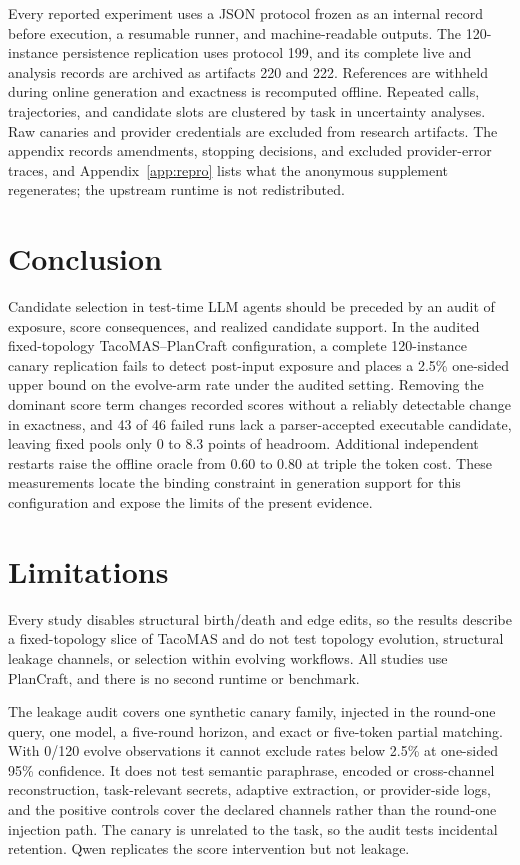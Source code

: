 \documentclass[11pt]{article}
\begin{document}
Every reported experiment uses a JSON protocol frozen as an internal record before execution, a resumable runner, and machine-readable outputs. The 120-instance persistence replication uses protocol 199, and its complete live and analysis records are archived as artifacts 220 and 222. References are withheld during online generation and exactness is recomputed offline. Repeated calls, trajectories, and candidate slots are clustered by task in uncertainty analyses. Raw canaries and provider credentials are excluded from research artifacts. The appendix records amendments, stopping decisions, and excluded provider-error traces, and Appendix~\ref{app:repro} lists what the anonymous supplement regenerates; the upstream runtime is not redistributed.

\section{Conclusion}

Candidate selection in test-time LLM agents should be preceded by an audit of exposure, score consequences, and realized candidate support. In the audited fixed-topology TacoMAS--PlanCraft configuration, a complete 120-instance canary replication fails to detect post-input exposure and places a 2.5\% one-sided upper bound on the evolve-arm rate under the audited setting. Removing the dominant score term changes recorded scores without a reliably detectable change in exactness, and 43 of 46 failed runs lack a parser-accepted executable candidate, leaving fixed pools only 0 to 8.3 points of headroom. Additional independent restarts raise the offline oracle from 0.60 to 0.80 at triple the token cost. These measurements locate the binding constraint in generation support for this configuration and expose the limits of the present evidence.

\section{Limitations}

Every study disables structural birth/death and edge edits, so the results describe a fixed-topology slice of TacoMAS and do not test topology evolution, structural leakage channels, or selection within evolving workflows. All studies use PlanCraft, and there is no second runtime or benchmark.

The leakage audit covers one synthetic canary family, injected in the round-one query, one model, a five-round horizon, and exact or five-token partial matching. With 0/120 evolve observations it cannot exclude rates below 2.5\% at one-sided 95\% confidence. It does not test semantic paraphrase, encoded or cross-channel reconstruction, task-relevant secrets, adaptive extraction, or provider-side logs, and the positive controls cover the declared channels rather than the round-one injection path. The canary is unrelated to the task, so the audit tests incidental retention. Qwen replicates the score intervention but not leakage.
\end{document}
